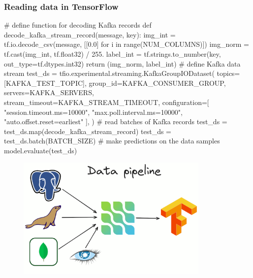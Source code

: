 \documentclass[10pt,utf8]{beamer}
\begin{document}
\begin{frame}[fragile]
    \frametitle{Reading data in TensorFlow}
    \vspace{-0.2cm}
    \footnotesize
    \begin{python}
# define function for decoding Kafka records
def decode_kafka_stream_record(message, key):
    img_int = tf.io.decode_csv(message, [[0.0] for i in range(NUM_COLUMNS)])
    img_norm = tf.cast(img_int, tf.float32) / 255.
    label_int = tf.strings.to_number(key, out_type=tf.dtypes.int32)
    return (img_norm, label_int)
# define Kafka data stream
test_ds = tfio.experimental.streaming.KafkaGroupIODataset(
    topics=[KAFKA_TEST_TOPIC],
    group_id=KAFKA_CONSUMER_GROUP,
    servers=KAFKA_SERVERS,
    stream_timeout=KAFKA_STREAM_TIMEOUT,
    configuration=[
        "session.timeout.ms=10000",
        "max.poll.interval.ms=10000",
        "auto.offset.reset=earliest"
    ],
)
# read batches of Kafka records
test_ds = test_ds.map(decode_kafka_stream_record)
test_ds = test_ds.batch(BATCH_SIZE)
# make predictions on the data samples
model.evaluate(test_ds)
    \end{python}
\end{frame}


\begin{frame}
    \begin{figure}
        \centering
        \includegraphics[height=6cm]{./img/dbs_to_tf_debezium.eps}
    \end{figure}
\end{frame}
\end{document}
